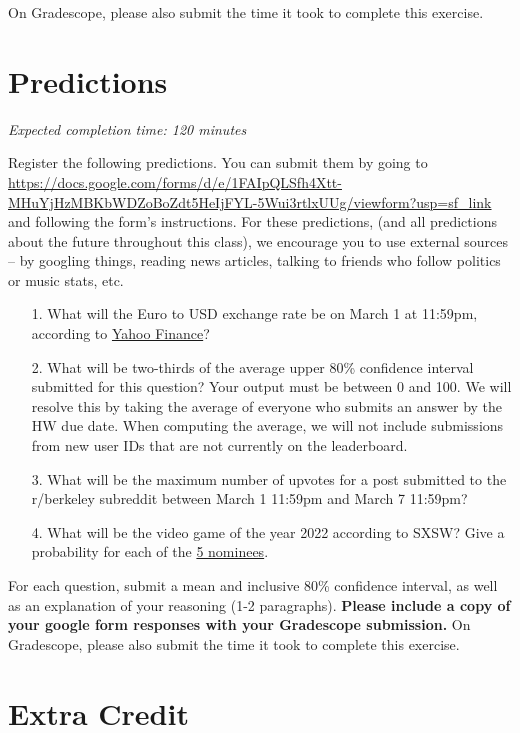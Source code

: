 \documentclass[11pt]{article}
\begin{document}
On Gradescope, please also submit the time it took to complete this exercise.

\section*{Predictions}

\emph{Expected completion time: 120 minutes}

Register the following predictions. You can submit them by going to \url{https://docs.google.com/forms/d/e/1FAIpQLSfh4Xtt-MHuYjHzMBKbWDZoBoZdt5HeIjFYL-5Wui3rtlxUUg/viewform?usp=sf_link} and following the form's instructions. For these predictions, (and all predictions about the future throughout this class), we encourage you to use external sources -- by googling things, reading news articles, talking to friends who follow politics or music stats, etc.

\begin{enumerate}
	\item[1.] What will the Euro to USD exchange rate be on March 1 at 11:59pm, according to \href{https://finance.yahoo.com/quote/EURUSD=X/?}{Yahoo Finance}?
	
	\item[2.] What will be two-thirds of the average upper 80\% confidence interval submitted for this question? Your output must be between 0 and 100. We will resolve this by taking the average of everyone who submits an answer by the HW due date. When computing the average, we will not include submissions from new user IDs that are not currently on the leaderboard.
	
	\item[3.] What will be the maximum number of upvotes for a post submitted to the r/berkeley subreddit between March 1 11:59pm and March 7 11:59pm?
	
	\item[4.] What will be the video game of the year 2022 according to SXSW? Give a probability for each of the \href{https://www.sxsw.com/awards/gaming-awards/?}{5 nominees}.
\end{enumerate}

For each question, submit a mean and inclusive 80\% confidence interval, as well as an explanation of your reasoning (1-2 paragraphs). \textbf{Please include a copy of your google form responses with your Gradescope submission.} On Gradescope, please also submit the time it took to complete this exercise.

\section*{Extra Credit}
\end{document}
